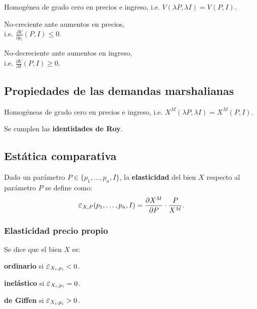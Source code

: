 \documentclass[8pt,a4paper]{extarticle}
\begin{document}
\begin{multicols}{3}
	\begin{eqlist}
		\item Homogénea de grado cero en precios e ingreso, i.e. $V(\lambda P, \lambda I) = V(P, I)$.
		\item No-creciente ante aumentos en precios, \\ i.e. $\displaystyle \frac{\partial V}{\partial p_i} (P, I) \leq 0$.
		\item No-decreciente ante aumentos en ingreso, \\ i.e. $\displaystyle \frac{\partial V}{\partial I} (P, I) \geq 0$.
	\end{eqlist}

	\subsection{Propiedades de las demandas marshalianas}

	\begin{eqlist}
		\item Homogéneas de grado cero en precios e ingreso, i.e. $X^M (\lambda P, \lambda I) = X^M(P, I)$.
		\item Se cumplen las \textbf{identidades de Roy}.
	\end{eqlist}

	\subsection{Estática comparativa}

	\begin{boxdef}[Elasticidad]
		Dado un parámetro $P \in \{ p_1,\ldots, p_n, I \}$, la \textbf{elasticidad} del bien $X$ respecto al parámetro $P$ se define como:
		\[
			\E_{X, P} (p_1,\ldots, p_n, I) = \frac{\partial X^M}{\partial P} \cdot \frac{P}{X^M}
			.\]
	\end{boxdef}

	\sectionbreak

	\subsubsection*{Elasticidad precio propio}

	Se dice que el bien $X$ es:

	\begin{eqlist}
		\item \textbf{ordinario} si $ \E_{X_i, p_i} < 0$.
		\item \textbf{inelástico} si $\E_{X_i, p_i} = 0$.
		\item \textbf{de Giffen} si $\E_{X_i, p_i} > 0$.
	\end{eqlist}


\end{multicols}
\end{document}
